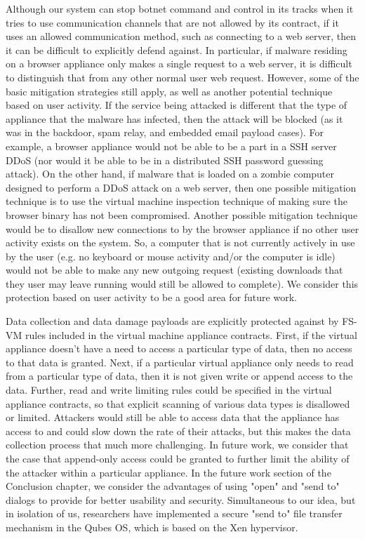 Although our system can stop botnet command and control in its tracks when it tries to use communication channels that are not allowed by its contract, if it uses an allowed communication method, such as connecting to a web server, then it can be difficult to explicitly defend against. In particular, if malware residing on a browser appliance only makes a single request to a web server, it is difficult to distinguish that from any other normal user web request. However, some of the basic mitigation strategies still apply, as well as another potential technique based on user activity. If the service being attacked is different that the type of appliance that the malware has infected, then the attack will be blocked (as it was in the backdoor, spam relay, and embedded email payload cases). For example, a browser appliance would not be able to be a part in a SSH server DDoS (nor would it be able to be in a distributed SSH password guessing attack). On the other hand, if malware that is loaded on a zombie computer designed to perform a DDoS attack on a web server, then one possible mitigation technique is to use the virtual machine inspection technique of making sure the browser binary has not been compromised. Another possible mitigation technique would be to disallow new connections to by the browser appliance if no other user activity exists on the system. So, a computer that is not currently actively in use by the user (e.g. no keyboard or mouse activity and/or the computer is idle) would not be able to make any new outgoing request (existing downloads that they user may leave running would still be allowed to complete). We consider this protection based on user activity to be a good area for future work.

Data collection and data damage payloads are explicitly protected against by FS-VM rules included in the virtual machine appliance contracts. First, if the virtual appliance doesn't have a need to access a particular type of data, then no access to that data is granted. Next, if a particular virtual appliance only needs to read from a particular type of data, then it is not given write or append access to the data. Further, read and write limiting rules could be specified in the virtual appliance contracts, so that explicit scanning of various data types is disallowed or limited. Attackers would still be able to access data that the appliance has access to and could slow down the rate of their attacks, but this makes the data collection process that much more challenging. In future work, we consider that the case that append-only access could be granted to further limit the ability of the attacker within a particular appliance. In the future work section of the Conclusion chapter, we consider the advantages of using "open" and "send to" dialogs to provide for better usability and security. Simultaneous to our idea, but in isolation of us, researchers have implemented a secure "send to" file transfer mechanism in the Qubes OS\cite{qubes-os_2010}, which is based on the Xen hypervisor.

